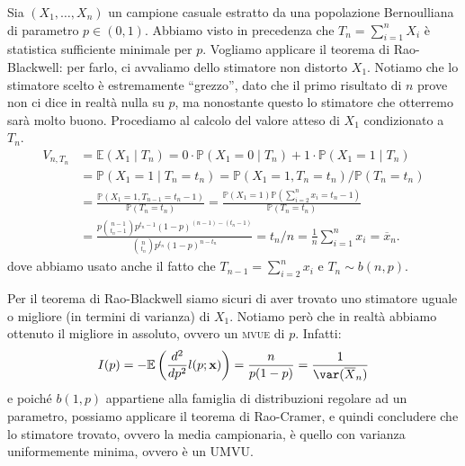 \begin{ese}
  Sia \((X_1,\dotsc,X_n)\) un campione casuale estratto da una popolazione
  Bernoulliana di parametro \(p \in (0,1)\).
  Abbiamo visto in precedenza che \(T_n=\sum_{i=1}^n X_i\) è statistica
  sufficiente minimale per \(p\).
  Vogliamo applicare il teorema di Rao-Blackwell: per farlo, ci
  avvaliamo dello stimatore non distorto \(X_1\). Notiamo che lo stimatore scelto è estremamente ``grezzo'', dato che il primo risultato di \(n\) prove non ci dice in realtà nulla su \(p\), ma nonostante questo lo stimatore che otterremo sarà molto buono.
  Procediamo al calcolo del valore atteso di \(X_1\) condizionato a \(T_n\).
  \begin{equation*}
    \begin{split}
    V_{n,T_n} &= \mathbb{E}(X_1 \mid T_n) 
      = 0 \cdot \mathbb{P} (X_1=0 \mid T_n) +
        1 \cdot \mathbb{P}(X_1=1 \mid T_n) \\
      &= \mathbb{P}(X_1=1 \mid T_n=t_n)
       = \mathbb{P}(X_1=1, T_n=t_n)/\mathbb{P}(T_n=t_n) \\
      &= \frac{\mathbb{P}(X_1=1, T_{n-1}=t_n-1)}{\mathbb{P}(T_n=t_n)}
       = \frac{\mathbb{P}(X_1=1) %
     \mathbb{P}(\sum_{i=2}^n x_i = t_n-1)}{\mathbb{P}(T_n=t_n)} \\
    &= \frac{p \binom{n-1}{t_n-1} p^{t_n-1} (1-p)^{(n-1)-(t_n-1)}}{\binom{n}{t_n} p^{t_n} (1-p)^{n-t_n}}
    = t_n/n
    = \frac{1}{n} \sum_{i=1}^n x_i = \overline{x}_n.
    \end{split}
  \end{equation*}
  dove abbiamo usato anche il fatto che $T_{n-1}=\sum_{i=2}^n x_i$ e $T_n \sim b(n,p)$.

  Per il teorema di Rao-Blackwell siamo sicuri di aver trovato uno stimatore uguale o migliore (in termini di varianza) di \(X_1\). Notiamo però che in realtà abbiamo ottenuto il migliore in assoluto, ovvero un \textsc{mvue} di \(p\). Infatti:
  \begin{equation*}
    I(p) = -\mathbb{E} \left(\frac{d^2}{dp^2} l(p;\mathbf{x}) \right) = \frac{n}{p(1-p)} = \frac{1}{\var(\overline{X}_n)}
  \end{equation*}
  e poiché \(b(1,p)\) appartiene alla famiglia di distribuzioni regolare
  ad un parametro, possiamo applicare il teorema di Rao-Cramer, e quindi concludere che lo stimatore trovato, ovvero la media campionaria, è quello con varianza uniformemente minima, ovvero è un UMVU.
\end{ese}


